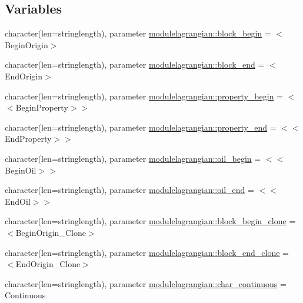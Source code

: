 \subsection*{Variables}
\begin{DoxyCompactItemize}
\item 
character(len=stringlength), parameter \mbox{\hyperlink{namespacemodulelagrangian_a3b2b97e0ca43dc95463c7c495dba5bbc}{modulelagrangian\+::block\+\_\+begin}} = \textquotesingle{}$<$Begin\+Origin$>$\textquotesingle{}
\item 
character(len=stringlength), parameter \mbox{\hyperlink{namespacemodulelagrangian_ac7dbdc0afd31f49c859b3f60122dd029}{modulelagrangian\+::block\+\_\+end}} = \textquotesingle{}$<$End\+Origin$>$\textquotesingle{}
\item 
character(len=stringlength), parameter \mbox{\hyperlink{namespacemodulelagrangian_ac725232043bb1c31fa21e57ed72c4949}{modulelagrangian\+::property\+\_\+begin}} = \textquotesingle{}$<$$<$Begin\+Property$>$$>$\textquotesingle{}
\item 
character(len=stringlength), parameter \mbox{\hyperlink{namespacemodulelagrangian_ac4553a88c5f02b9c1d41a6579d59eb3a}{modulelagrangian\+::property\+\_\+end}} = \textquotesingle{}$<$$<$End\+Property$>$$>$\textquotesingle{}
\item 
character(len=stringlength), parameter \mbox{\hyperlink{namespacemodulelagrangian_a76e98eb6095cdfb93d04d92fb037928f}{modulelagrangian\+::oil\+\_\+begin}} = \textquotesingle{}$<$$<$Begin\+Oil$>$$>$\textquotesingle{}
\item 
character(len=stringlength), parameter \mbox{\hyperlink{namespacemodulelagrangian_aba7b7a58cc57d4825f1e6c07f448a8b0}{modulelagrangian\+::oil\+\_\+end}} = \textquotesingle{}$<$$<$End\+Oil$>$$>$\textquotesingle{}
\item 
character(len=stringlength), parameter \mbox{\hyperlink{namespacemodulelagrangian_a63c4b724f3174887fab565a1d41c783d}{modulelagrangian\+::block\+\_\+begin\+\_\+clone}} = \textquotesingle{}$<$Begin\+Origin\+\_\+\+Clone$>$\textquotesingle{}
\item 
character(len=stringlength), parameter \mbox{\hyperlink{namespacemodulelagrangian_aa39d97711af9effc178ac42915d081f9}{modulelagrangian\+::block\+\_\+end\+\_\+clone}} = \textquotesingle{}$<$End\+Origin\+\_\+\+Clone$>$\textquotesingle{}
\item 
character(len=stringlength), parameter \mbox{\hyperlink{namespacemodulelagrangian_ae77cee5914a2507aed736ffd525ac90d}{modulelagrangian\+::char\+\_\+continuous}} = \textquotesingle{}Continuous\textquotesingle{}

\end{DoxyCompactItemize}
